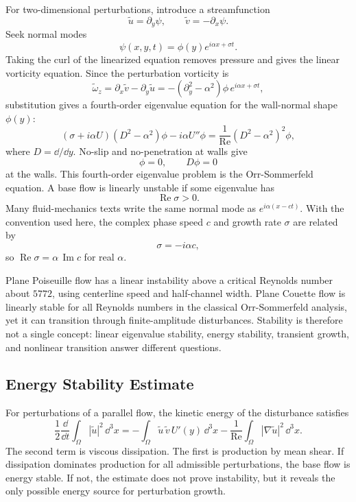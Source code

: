 For two-dimensional perturbations, introduce a streamfunction
\[
  \tilde u=\partial_y\psi,\qquad
  \tilde v=-\partial_x\psi.
\]
Seek normal modes
\[
  \psi(x,y,t)=\phi(y)e^{i\alpha x+\sigma t}.
\]
Taking the curl of the linearized equation removes pressure and gives the
linear vorticity equation. Since the perturbation vorticity is
\[
  \tilde\omega_z
  =
  \partial_x\tilde v-\partial_y\tilde u
  =
  -(\partial_y^2-\alpha^2)\phi\,e^{i\alpha x+\sigma t},
\]
substitution gives a fourth-order eigenvalue equation for the wall-normal
shape \(\phi(y)\):
\[
  \boxed{
  (\sigma+i\alpha U)(D^2-\alpha^2)\phi
  -
  i\alpha U''\phi
  =
  \frac1{\mathrm{Re}}(D^2-\alpha^2)^2\phi,
  }
\]
where \(D=\dd/\dd y\). No-slip and no-penetration at walls give
\[
  \phi=0,\qquad D\phi=0
\]
at the walls. This fourth-order eigenvalue problem is the
Orr-Sommerfeld equation. A base flow is linearly unstable if some eigenvalue has
\[
  \operatorname{Re}\sigma>0.
\]
Many fluid-mechanics texts write the same normal mode as
\(e^{i\alpha(x-ct)}\). With the convention used here, the complex phase speed
\(c\) and growth rate \(\sigma\) are related by
\[
  \sigma=-i\alpha c,
\]
so \(\operatorname{Re}\sigma=\alpha\,\operatorname{Im}c\) for real
\(\alpha\).

\begin{remark}
Plane Poiseuille flow has a linear instability above a critical Reynolds number
about \(5772\), using centerline speed and half-channel width. Plane Couette
flow is linearly stable for all Reynolds numbers in the classical
Orr-Sommerfeld analysis, yet it can transition through finite-amplitude
disturbances. Stability is therefore not a single concept: linear eigenvalue
stability, energy stability, transient growth, and nonlinear transition answer
different questions.
\end{remark}

\subsection{Energy Stability Estimate}
\label{subsec:energy-stability}

For perturbations of a parallel flow, the kinetic energy of the disturbance
satisfies
\[
  \frac12\frac{\dd}{\dd t}\int_\Omega |\tilde u|^2\,\dd^3x
  =
  -\int_\Omega \tilde u\,\tilde v\,U'(y)\,\dd^3x
  -
  \frac1{\mathrm{Re}}
  \int_\Omega |\nabla\tilde u|^2\,\dd^3x.
\]
The second term is viscous dissipation. The first is production by mean shear.
If dissipation dominates production for all admissible perturbations, the base
flow is energy stable. If not, the estimate does not prove instability, but it
reveals the only possible energy source for perturbation growth.

